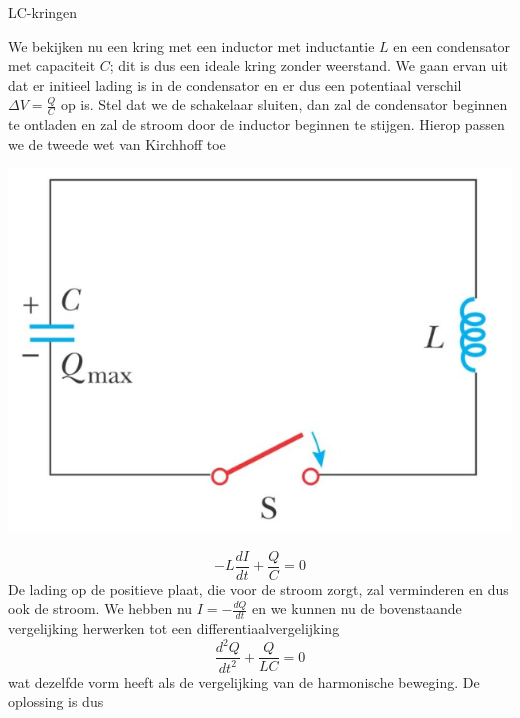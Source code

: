 \begin{app}[LC-kringen]{LC-kringen}
    \vspace{-0.2cm}
    \begin{minipage}{.73\textwidth}
        We bekijken nu een kring met een inductor met inductantie $L$ en een condensator met capaciteit $C$; dit is dus een ideale kring zonder weerstand. 
        We gaan ervan uit dat er initieel lading is in de condensator en er dus een potentiaal verschil $\Delta V = \tfrac{Q}{C}$ op is. Stel dat we de schakelaar sluiten, 
        dan zal de condensator beginnen te ontladen en zal de stroom door de inductor beginnen te stijgen. Hierop passen we de tweede wet van Kirchhoff toe
    \end{minipage}
    \begin{minipage}{.23\textwidth}
        \vspace{0.3cm}\includegraphics[scale = 0.35]{Images/Magnetisme/LCKring}
    \end{minipage}
    \vspace{-0.3cm}
    \begin{equation*}
        -L\dfrac{dI}{dt} + \dfrac{Q}{C} = 0
    \end{equation*}
    De lading op de positieve plaat, die voor de stroom zorgt, zal verminderen en dus ook de stroom. We hebben nu $I = -\tfrac{dQ}{dt}$ en we kunnen nu de bovenstaande vergelijking herwerken tot
    een differentiaalvergelijking
    \begin{equation*}
        \dfrac{d^{2}Q}{dt^{2}} + \dfrac{Q}{LC} = 0
    \end{equation*}
    wat dezelfde vorm heeft als de vergelijking van de harmonische beweging. De oplossing is dus


\end{app}
